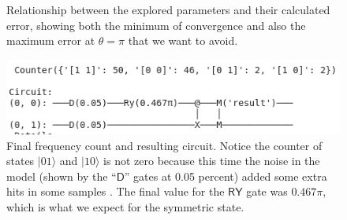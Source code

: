 \documentclass[11pt]{article}
\begin{document}
\begin{figure}[h!]
\caption{Relationship between the explored parameters and their calculated error, showing both the minimum of convergence and also the maximum error at $\theta = \pi$ that we want to avoid.}
\includegraphics[scale=0.5]{result100}
\caption{Final frequency count and resulting circuit. Notice the counter of states $|01\rangle$ and $|10\rangle$ is not zero because this time the noise in the model (shown by the ``$\textsf{D}$'' gates at 0.05 percent) added some extra hits in some samples . The final value for the $\textsf{RY}$ gate was $0.467 \pi$, which is what we expect for the symmetric state.}
\end{figure}
\end{document}
